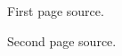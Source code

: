 \documentclass{article}
\begin{document}
First page source.

\newpage
Second page source.

\end{document}
